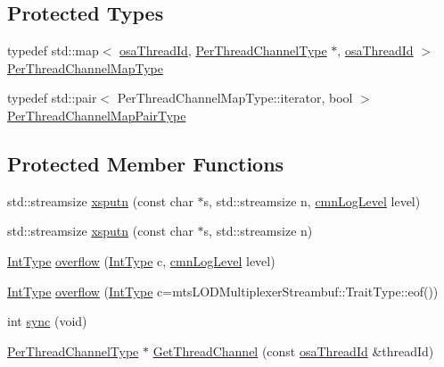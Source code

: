 \subsection*{Protected Types}
\begin{DoxyCompactItemize}
\item 
typedef std\+::map$<$ \hyperlink{classosa_thread_id}{osa\+Thread\+Id}, \hyperlink{classmts_l_o_d_multiplexer_streambuf_a945f4bdc4f4a79290018377ae3de68e9}{Per\+Thread\+Channel\+Type} $\ast$, \hyperlink{classosa_thread_id}{osa\+Thread\+Id} $>$ \hyperlink{classmts_l_o_d_multiplexer_streambuf_aff1696a1ada12cd77decfe1deb5d8a63}{Per\+Thread\+Channel\+Map\+Type}
\item 
typedef std\+::pair$<$ Per\+Thread\+Channel\+Map\+Type\+::iterator, bool $>$ \hyperlink{classmts_l_o_d_multiplexer_streambuf_aa6778f2331bcb1be3e4817612b97f42a}{Per\+Thread\+Channel\+Map\+Pair\+Type}
\end{DoxyCompactItemize}
\subsection*{Protected Member Functions}
\begin{DoxyCompactItemize}
\item 
std\+::streamsize \hyperlink{classmts_l_o_d_multiplexer_streambuf_acb1efb148cf0c6b3f491334900a10ff6}{xsputn} (const char $\ast$s, std\+::streamsize n, \hyperlink{cmn_log_lo_d_8h_a70c67165c37a0971e0dd1a85d4edaaae}{cmn\+Log\+Level} level)
\item 
std\+::streamsize \hyperlink{classmts_l_o_d_multiplexer_streambuf_aed21202f0ac5d81069e981ba1c8c2456}{xsputn} (const char $\ast$s, std\+::streamsize n)
\item 
\hyperlink{classmts_l_o_d_multiplexer_streambuf_a21823525be07ef7a8c1c3b053f3fedf2}{Int\+Type} \hyperlink{classmts_l_o_d_multiplexer_streambuf_a28d2e71bb95fadc157b7debc88f039a9}{overflow} (\hyperlink{classmts_l_o_d_multiplexer_streambuf_a21823525be07ef7a8c1c3b053f3fedf2}{Int\+Type} c, \hyperlink{cmn_log_lo_d_8h_a70c67165c37a0971e0dd1a85d4edaaae}{cmn\+Log\+Level} level)
\item 
\hyperlink{classmts_l_o_d_multiplexer_streambuf_a21823525be07ef7a8c1c3b053f3fedf2}{Int\+Type} \hyperlink{classmts_l_o_d_multiplexer_streambuf_a511a51ffb7c773e0de10d852e00ddeff}{overflow} (\hyperlink{classmts_l_o_d_multiplexer_streambuf_a21823525be07ef7a8c1c3b053f3fedf2}{Int\+Type} c=mts\+L\+O\+D\+Multiplexer\+Streambuf\+::\+Trait\+Type\+::eof())
\item 
int \hyperlink{classmts_l_o_d_multiplexer_streambuf_ab41fabcf881375e67f739986cd83f71d}{sync} (void)
\item 
\hyperlink{classmts_l_o_d_multiplexer_streambuf_a945f4bdc4f4a79290018377ae3de68e9}{Per\+Thread\+Channel\+Type} $\ast$ \hyperlink{classmts_l_o_d_multiplexer_streambuf_ac2a1f3cc381c102700cd148d482b0342}{Get\+Thread\+Channel} (const \hyperlink{classosa_thread_id}{osa\+Thread\+Id} \&thread\+Id)
\end{DoxyCompactItemize}
